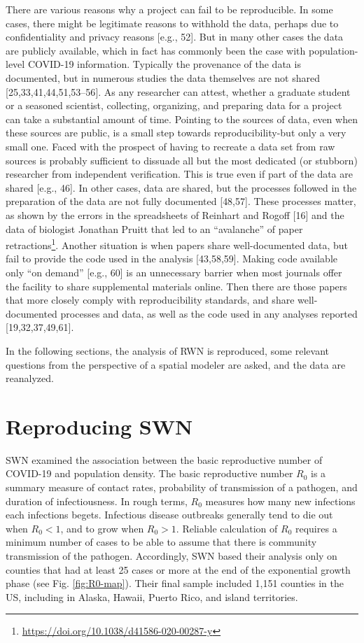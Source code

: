 \documentclass[10pt,letterpaper]{article}
\begin{document}
There are various reasons why a project can fail to be reproducible. In
some cases, there might be legitimate reasons to withhold the data,
perhaps due to confidentiality and privacy reasons {[}e.g., 52{]}. But
in many other cases the data are publicly available, which in fact has
commonly been the case with population-level COVID-19 information.
Typically the provenance of the data is documented, but in numerous
studies the data themselves are not shared {[}25,33,41,44,51,53--56{]}.
As any researcher can attest, whether a graduate student or a seasoned
scientist, collecting, organizing, and preparing data for a project can
take a substantial amount of time. Pointing to the sources of data, even
when these sources are public, is a small step towards
reproducibility-but only a very small one. Faced with the prospect of
having to recreate a data set from raw sources is probably sufficient to
dissuade all but the most dedicated (or stubborn) researcher from
independent verification. This is true even if part of the data are
shared {[}e.g., 46{]}. In other cases, data are shared, but the
processes followed in the preparation of the data are not fully
documented {[}48,57{]}. These processes matter, as shown by the errors
in the spreadsheets of Reinhart and Rogoff {[}16{]} and the data of
biologist Jonathan Pruitt that led to an ``avalanche'' of paper
retractions\footnote{\url{https://doi.org/10.1038/d41586-020-00287-y}}.
Another situation is when papers share well-documented data, but fail to
provide the code used in the analysis {[}43,58,59{]}. Making code
available only ``on demand'' {[}e.g., 60{]} is an unnecessary barrier
when most journals offer the facility to share supplemental materials
online. Then there are those papers that more closely comply with
reproducibility standards, and share well-documented processes and data,
as well as the code used in any analyses reported {[}19,32,37,49,61{]}.

In the following sections, the analysis of RWN is reproduced, some
relevant questions from the perspective of a spatial modeler are asked,
and the data are reanalyzed.

\hypertarget{reproducing-swn}{%
\section{Reproducing SWN}\label{reproducing-swn}}

SWN examined the association between the basic reproductive number of
COVID-19 and population density. The basic reproductive number \(R_0\)
is a summary measure of contact rates, probability of transmission of a
pathogen, and duration of infectiousness. In rough terms, \(R_0\)
measures how many new infections each infections begets. Infectious
disease outbreaks generally tend to die out when \(R_0<1\), and to grow
when \(R_0>1\). Reliable calculation of \(R_0\) requires a minimum
number of cases to be able to assume that there is community
transmission of the pathogen. Accordingly, SWN based their analysis only
on counties that had at least 25 cases or more at the end of the
exponential growth phase (see Fig. \ref{fig:R0-map}). Their final sample
included 1,151 counties in the US, including in Alaska, Hawaii, Puerto
Rico, and island territories.
\end{document}

